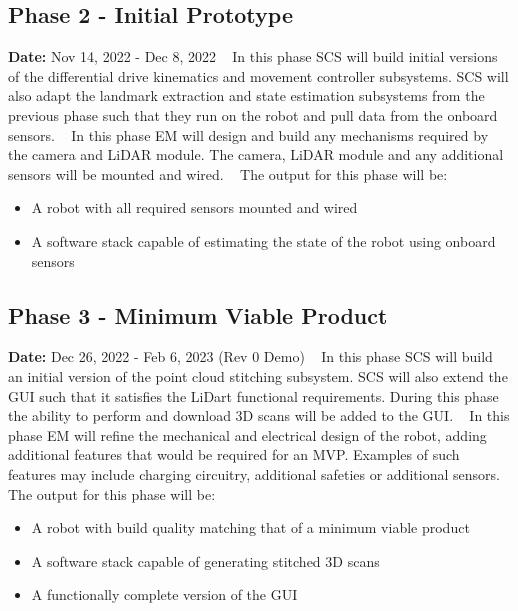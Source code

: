 \documentclass[12pt]{article}
\begin{document}
\subsection{Phase 2 - Initial Prototype}
\textbf{Date:} Nov 14, 2022 - Dec 8, 2022
\ \newline\newline
In this phase SCS will build initial versions of the differential drive kinematics and
movement controller subsystems. SCS will also adapt the landmark extraction and state estimation
subsystems from the previous phase such that they run on the robot and pull data from
the onboard sensors.
\ \newline\newline
In this phase EM will design and build any mechanisms required by the camera and LiDAR module.
The camera, LiDAR module and any additional sensors will be mounted and wired. 
\ \newline\newline
The output for this phase will be:
\begin{itemize}
\item A robot with all required sensors mounted and wired
\item A software stack capable of estimating the state of the robot using onboard sensors
\end{itemize}

\subsection{Phase 3 - Minimum Viable Product}
\textbf{Date:} Dec 26, 2022 - Feb 6, 2023 (Rev 0 Demo)
\ \newline\newline
In this phase SCS will build an initial version of the point cloud stitching subsystem. SCS
will also extend the GUI such that it satisfies the LiDart functional requirements. During this
phase the ability to perform and download 3D scans will be added to the GUI.
\ \newline\newline
In this phase EM will refine the mechanical and electrical design of the robot, adding additional
features that would be required for an MVP. Examples of such features may include charging circuitry,
additional safeties or additional sensors.
\ \newline\newline
The output for this phase will be:
\begin{itemize}
\item A robot with build quality matching that of a minimum viable product
\item A software stack capable of generating stitched 3D scans
\item A functionally complete version of the GUI
\end{itemize}
\end{document}
